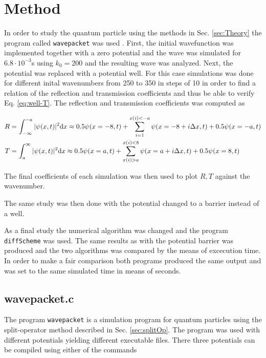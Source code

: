 \section{Method}
\label{sec:method of stuff}

In order to study the quantum particle using the methods in Sec. \ref{sec:Theory} the program called \verb|wavepacket| was used \cite{wavepacket}. First, the initial wavefunction was implemented together with a zero potential and the wave was simulated for $6.8 \cdot 10^{-3}$s using $k_0 = 200$ and the resulting wave was analyzed. Next, the potential was replaced with a potential well. For this case simulations was done for different inital wavenumbers from 250 to 350 in steps of 10 in order to find a relation of the reflection and transmission coefficients and thus be able to verify Eq. \eqref{eq:well-T}. The reflection and transmission coefficients was computed as

\begin{equation}
  \label{eq:RTnumerical}
  \begin{split}
    R &= \int_{-\infty}^{-a}|\psi(x,t)|^2\textnormal{d} x \approx 0.5\psi(x=-8,t) + \sum_{i=1}^{x(i)<-a} \psi(x=-8+i\Delta x,t) + 0.5\psi(x=-a,t)\\
    T &= \int_{a}^{\infty}|\psi(x,t)|^2\textnormal{d} x \approx 0.5\psi(x=a,t) + \sum_{x(i)>a}^{x(i)<8} \psi(x=a+i\Delta x,t) + 0.5\psi(x=8,t)\\
  \end{split}
\end{equation}

The final coefficients of each simulation was then used to plot $R,T$ against the wavenumber.

The same study was then done with the potential changed to a barrier instead of a well.

As a final study the numerical algorithm was changed and the program \verb|diffScheme| was used. The same results as with the potential barrier was produced and the two algorithms was compared by the means of excecution time. In order to make a fair comparison both programs produced the same output and was set to the same simulated time in means of seconds.

\subsection{wavepacket.c}

The program \verb|wavepacket| is a simulation program for quantum particles using the split-operator method described in Sec. \ref{sec:splitOp}. The program was used with different potentials yielding different executable files. There three potentials can be compiled using either of the commands

